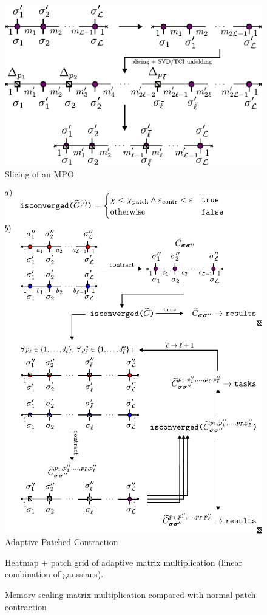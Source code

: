 \begin{figure}[ht!]
    \centering
    \includegraphics{figures/SlicingMPO.pdf}
    \caption{Slicing of an MPO}
\end{figure}

\begin{figure}[ht!]
    \centering
    \includegraphics{figures/AdaptivePatchContr.pdf}
    \caption{Adaptive Patched Contraction }
\end{figure}

\begin{figure}[ht!]
    \caption{Heatmap + patch grid of adaptive matrix multiplication (linear combination of gaussians). }
\end{figure}

\begin{figure}[ht!]
    \caption{Memory scaling matrix multiplication compared with normal patch contraction }
\end{figure}


